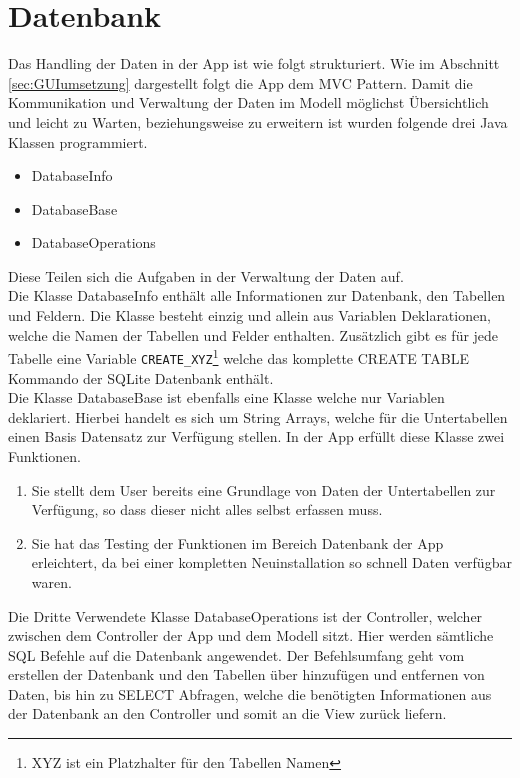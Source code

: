 \section{Datenbank}

Das Handling der Daten in der App ist wie folgt strukturiert. Wie im Abschnitt \ref{sec:GUIumsetzung} dargestellt folgt die App dem MVC Pattern. Damit die Kommunikation und Verwaltung der Daten im Modell möglichst Übersichtlich und leicht zu Warten, beziehungsweise zu erweitern ist wurden folgende drei Java Klassen programmiert.

\begin{itemize}
	\item DatabaseInfo
	\item DatabaseBase
	\item DatabaseOperations
\end{itemize}

Diese Teilen sich die Aufgaben in der Verwaltung der Daten auf. \\

Die Klasse DatabaseInfo enthält alle Informationen zur Datenbank, den Tabellen und Feldern. Die Klasse besteht einzig und allein aus Variablen Deklarationen, welche die Namen der Tabellen und Felder enthalten. Zusätzlich gibt es für jede Tabelle eine Variable \texttt{CREATE\_XYZ}\footnote{XYZ ist ein Platzhalter für den Tabellen Namen} welche das komplette CREATE TABLE Kommando der SQLite Datenbank enthält.\\

Die Klasse DatabaseBase ist ebenfalls eine Klasse welche nur Variablen deklariert. Hierbei handelt es sich um String Arrays, welche für die Untertabellen einen Basis Datensatz zur Verfügung stellen. In der App erfüllt diese Klasse zwei Funktionen.

\begin{enumerate}
	\item Sie stellt dem User bereits eine Grundlage von Daten der Untertabellen zur Verfügung, so dass dieser nicht alles selbst erfassen muss.
	\item Sie hat das Testing der Funktionen im Bereich Datenbank der App erleichtert, da bei einer kompletten Neuinstallation so schnell Daten verfügbar waren.
\end{enumerate}

Die Dritte Verwendete Klasse DatabaseOperations ist der Controller, welcher zwischen dem Controller der App und dem Modell sitzt. Hier werden sämtliche SQL Befehle auf die Datenbank angewendet. Der Befehlsumfang geht vom erstellen der Datenbank und den Tabellen über hinzufügen und entfernen von Daten, bis hin zu SELECT Abfragen, welche die benötigten Informationen aus der Datenbank an den Controller und somit an die View zurück liefern.\\

